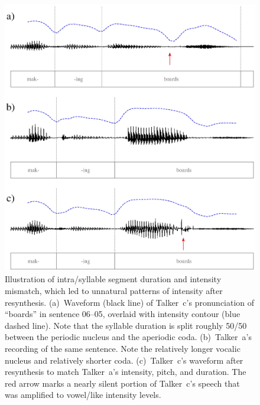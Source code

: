\begin{figure}
	\begin{centering}
	\includegraphics{figures/segmentMismatch/segmentMismatch.eps}
	\caption[Segment duration mismatch in resynthesis]{Illustration of intra\-/syllable segment duration and intensity mismatch, which led to unnatural patterns of intensity after resynthesis.  (a)~Waveform (black line) of Talker~\ac{c}’s pronunciation of “boards” in sentence 06–05, overlaid with intensity contour (blue dashed line).  Note that the syllable duration is split roughly 50/50 between the periodic nucleus and the aperiodic coda.  (b)~Talker~\ac{a}’s recording of the same sentence.  Note the relatively longer vocalic nucleus and relatively shorter coda.  (c)~Talker~\ac{c}’s waveform after resynthesis to match Talker~\ac{a}’s intensity, pitch, and duration.  The red arrow marks a nearly silent portion of Talker~\ac{c}’s speech that was amplified to vowel\-/like intensity levels.\label{fig:SegDurMismatch}}
	\end{centering}
\end{figure}

